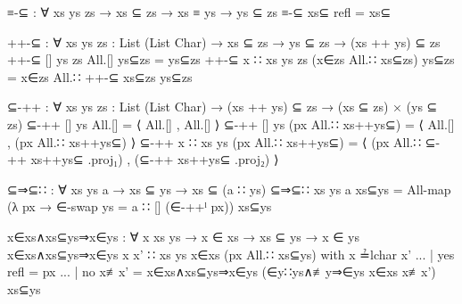 \begin{code}
  ≡-⊆ : ∀ {xs ys zs} → xs ⊆ zs → xs ≡ ys → ys ⊆ zs
  ≡-⊆ xs⊆ refl = xs⊆

  ++-⊆ : ∀ {xs ys zs : List (List Char)} → xs ⊆ zs → ys ⊆ zs → (xs ++ ys) ⊆ zs
  ++-⊆ {[]} {ys} {zs} All.[] ys⊆zs = ys⊆zs
  ++-⊆ {x ∷ xs} {ys} {zs} (x∈zs All.∷ xs⊆zs) ys⊆zs = x∈zs All.∷ ++-⊆ xs⊆zs ys⊆zs

  ⊆-++ : ∀ {xs ys zs : List (List Char)} → (xs ++ ys) ⊆ zs → (xs ⊆ zs) × (ys ⊆ zs)
  ⊆-++ {[]} {ys} All.[] = ⟨ All.[] , All.[] ⟩
  ⊆-++ {[]} {ys} (px All.∷ xs++ys⊆) =
    ⟨ All.[] , (px All.∷ xs++ys⊆) ⟩
  ⊆-++ {x ∷ xs} {ys} (px All.∷ xs++ys⊆) =
    ⟨ (px All.∷ ⊆-++ xs++ys⊆ .proj₁)
    , (⊆-++ xs++ys⊆ .proj₂) ⟩

  ⊆⇒⊆∷ : ∀ {xs ys a} → xs ⊆ ys → xs ⊆ (a ∷ ys)
  ⊆⇒⊆∷ {xs} {ys} {a} xs⊆ys = All-map (λ px → ∈-swap {ys = a ∷ []} (∈-++ˡ px)) xs⊆ys

  x∈xs∧xs⊆ys⇒x∈ys : ∀ {x xs ys} → x ∈ xs → xs ⊆ ys → x ∈ ys
  x∈xs∧xs⊆ys⇒x∈ys {x} {x' ∷ xs} {ys} x∈xs (px All.∷ xs⊆ys) with x ≟lchar x'
  ... | yes refl = px
  ... | no  x≢x' = x∈xs∧xs⊆ys⇒x∈ys (∈y∷ys∧≢y⇒∈ys x∈xs x≢x') xs⊆ys
\end{code}
